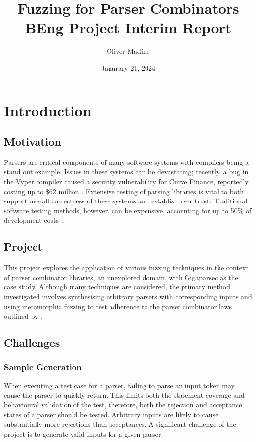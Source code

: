 \documentclass{article}
\title{Fuzzing for Parser Combinators \\ {\large BEng Project Interim Report}}
\author{Oliver Madine}
\date{Janurary 21, 2024}
\let\oldciteauthor\citeauthor
\renewcommand{\citeauthor}[1]{\oldciteauthor{#1} \cite{#1}}
\begin{document}
\maketitle

\section{Introduction} %

\subsection{Motivation}
Parsers are critical components of many software systems with compilers being a stand out example. Issues in these systems can be devastating; recently, a bug in the Vyper compiler caused a security vulnerability for Curve Finance, reportedly costing up to \$62 million \cite{curve}. Extensive testing of parsing libraries is vital to both support overall correctness of these systems and establish user trust. Traditional software testing methods, however, can be expensive, accounting for up to 50\% of development costs \cite{quickcheck}.

\subsection{Project}
This project explores the application of various fuzzing techniques in the context of parser combinator libraries, an unexplored domain, with Gigaparsec \cite{Gigaparsec} as the case study. Although many techniques are considered, the primary method investigated involves synthesising arbitrary parsers with corresponding inputs and using metamorphic fuzzing \cite{metamorphic} to test adherence to the parser combinator laws outlined by \citeauthor{parsley}.

\subsection{Challenges}

\subsubsection{Sample Generation}
When executing a test case for a parser, failing to parse an input token may cause the parser to quickly return. This limits both the statement coverage and behavioural validation of the test, therefore, both the rejection and acceptance states of a parser should be tested. Arbitrary inputs are likely to cause substantially more rejections than acceptances. A significant challenge of the project is to generate valid inputs for a given parser. 
\end{document}
